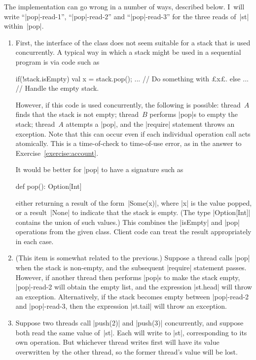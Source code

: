 \begin{answerS}
The implementation can go wrong in a number of ways, described below.  I~will
write ``|pop|-read-1'', ``|pop|-read-2'' and ``|pop|-read-3'' for the three
reads of~|st| within~|pop|.
%
\begin{enumerate}
\item First, the interface of the class does not seem suitable for a stack
  that is used concurrently.  A typical way in which a stack might be used in
  a sequential program is via code such as
\begin{scala}
  if(!stack.isEmpty){ 
    val x = stack.pop(); ... // Do something with £x£.
  }
  else ... // Handle the empty stack.
\end{scala}
However, if this code is used concurrently, the following is possible:
thread~$A$ finds that the stack is not empty; thread~$B$ performs |pop|s to
empty the stack; thread~$A$ attempts a |pop|, and the |require| statement
throws an exception.  Note that this can occur even if each individual
operation call acts atomically.  This is a time-of-check to time-of-use error,
as in the answer to Exercise~\ref{exercise:account}.

It would be better for |pop| to have a signature such as
\begin{scala}
  def pop(): Option[Int]
\end{scala}
either returning a result of the form~|Some(x)|, where |x| is the value
popped, or a result~|None| to indicate that the stack is empty.  (The type
|Option[Int]| contains the union of such values.)  This combines the |isEmpty|
and |pop| operations from the given class.  Client code can treat the result
appropriately in each case.  

\item (This item is somewhat related to the previous.)  Suppose a thread calls
  |pop| when the stack is non-empty, and the subsequent |require| statement
  passes.  However, if another thread then performs |pop|s to make the stack
  empty, |pop|-read-2 will obtain the empty list, and the expression |st.head|
  will throw an exception.  Alternatively, if the stack becomes empty between
  |pop|-read-2 and |pop|-read-3, then the expression |st.tail| will throw an
  exception.

\item Suppose two threads call |push(2)| and |push(3)| concurrently, and
  suppose both read the same value of~|st|.  Each will write to |st|,
  corresponding to its own operation.  But whichever thread writes first will
  have its value overwritten by the other thread, so the former thread's value
  will be lost.


\end{enumerate}
\end{answerS}
